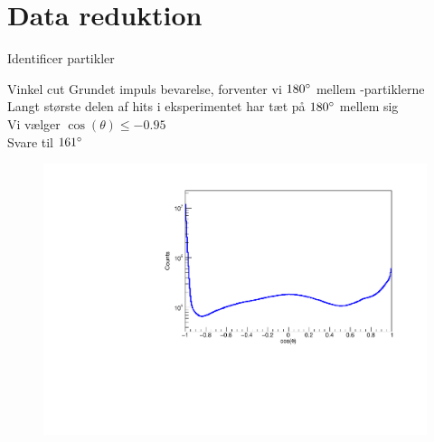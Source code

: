 \section{Data reduktion}

\begin{frame}{Identificer partikler}
	\begin{itemize}
	\end{itemize}
\end{frame}


\begin{frame}{Vinkel cut}
	Grundet impuls bevarelse, forventer vi $180 \degree $ mellem \al-partiklerne\\
	Langt største delen af hits i eksperimentet har tæt på $180 \degree$ mellem sig\\
	Vi vælger $\cos(\theta) \leq -0.95$\\
	Svare til $161\degree$
	\begin{figure}
		\centering
		\includegraphics[width=.7\columnwidth]{../figures/cosang.pdf}
	\end{figure}
\end{frame}

